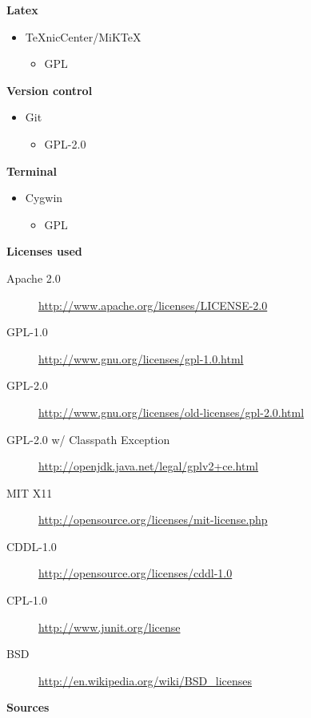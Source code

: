 	{\bf Latex}
		\begin{itemize}
			\item TeXnicCenter/MiKTeX
				\begin{itemize}
					\item GPL
				\end{itemize}
		\end{itemize}
	{\bf Version control}
		\begin{itemize}
			\item Git
				\begin{itemize}
					\item GPL-2.0
				\end{itemize}
		\end{itemize}
	{\bf Terminal}
		\begin{itemize}
			\item Cygwin
				\begin{itemize}
					\item GPL
				\end{itemize}
		\end{itemize}
	{\bf Licenses used}
	\begin{description}
		\item[Apache 2.0] \url{http://www.apache.org/licenses/LICENSE-2.0}
		\item[GPL-1.0] \url{http://www.gnu.org/licenses/gpl-1.0.html}
		\item[GPL-2.0] \url{http://www.gnu.org/licenses/old-licenses/gpl-2.0.html}
		\item[GPL-2.0 w/ Classpath Exception] \url{http://openjdk.java.net/legal/gplv2+ce.html}
		\item[MIT X11] \url{http://opensource.org/licenses/mit-license.php}
		\item[CDDL-1.0] \url{http://opensource.org/licenses/cddl-1.0}
		\item[CPL-1.0] \url{http://www.junit.org/license}
		\item[BSD] \url{http://en.wikipedia.org/wiki/BSD\_licenses}
	\end{description}
	{\bf Sources}
